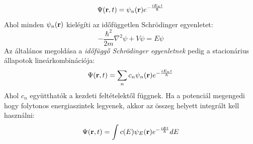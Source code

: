 \documentclass[../main.tex]{subfiles}
\begin{document}
\begin{equation}
    \Psi(\bold{r},t) = \psi_n (\bold{r}) e^{- \frac{i E_n t}{\hbar}}
\end{equation}
Ahol minden $\psi_n (\bold{r})$ kielégíti az időfüggetlen Schrödinger egyenletet:
\begin{equation}
    \boxed{- \frac{\hbar^2}{2m} \nabla^2 \psi + V \psi = E \psi}
\end{equation}
Az általános megoldása a \textit{időfüggő Schrödinger egyenletnek} pedig a stacionárius állapotok lineárkombinációja:
\begin{equation}
    \Psi(\bold{r},t) = \sum_n c_n \psi_n (\bold{r}) e^{- \frac{i E_n t}{\hbar}}
\end{equation}
Ahol $c_n$ együtthatók a kezdeti feltételektől függnek. Ha a potenciál megengedi hogy folytonos energiaszintek legyenek, akkor az összeg helyett integrált kell használni:
\begin{equation}
    \Psi(\bold{r},t) = \int c(E) \psi_E (\bold{r}) e^{- \frac{i E t}{\hbar}} dE
\end{equation}
\end{document}
